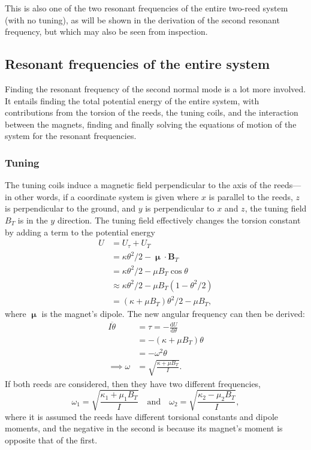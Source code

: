 \documentclass{article}
\begin{document}
This is also one of the two resonant frequencies of the entire two-reed system (with no tuning), as will be shown in the derivation of the second resonant frequency, but which may also be seen from inspection.

\subsection{Resonant frequencies of the entire system}
Finding the resonant frequency of the second normal mode is a lot more involved. It entails finding the total potential energy of the entire system, with contributions from the torsion of the reeds, the tuning coils, and the interaction between the magnets, finding and finally solving the equations of motion of the system for the resonant frequencies.
\subsubsection{Tuning}
The tuning coils induce a magnetic field perpendicular to the axis of the reeds---in other words, if a coordinate system is given where $x$ is parallel to the reeds, $z$ is perpendicular to the ground, and $y$ is perpendicular to $x$ and $z$, the tuning field $B_T$ is in the $y$ direction. The tuning field effectively changes the torsion constant by adding a term to the potential energy
\begin{equation*}
    \begin{aligned}
        U   &= U_\tau + U_T \\
            &= \kappa\theta^2/2 - \bm{\upmu}\cdot\mathbf{B}_T \\
            &= \kappa\theta^2/2 - \mu B_T \cos \theta \\
            &\approx \kappa\theta^2/2 - \mu B_T (1-\theta^2/2) \\
            &= (\kappa+\mu B_T)\theta^2/2 - \mu B_T,
    \end{aligned}
\end{equation*}
where $\bm{\upmu}$ is the magnet's dipole. The new angular frequency can then be derived:
\begin{equation*}
    \begin{aligned}
        I \ddot{\theta} &= \tau = -\frac{\mathrm{d}U}{\mathrm{d}\theta} \\
            &= -(\kappa + \mu B_T)\theta \\
            &= -\omega^2 \theta \\
           \implies \omega &=  \sqrt{\frac{\kappa + \mu B_T}{I}}.
    \end{aligned}
\end{equation*}
If both reeds are considered, then they have two different frequencies,
\begin{equation*}
    \omega_1 = \sqrt{\frac{\kappa_1 + \mu_1 B_T}{I}}\quad\text{and}\quad\omega_2 = \sqrt{\frac{\kappa_2 - \mu_2 B_T}{I}},
\end{equation*}
where it is assumed the reeds have different torsional constants and dipole moments, and the negative in the second is because its magnet's moment is opposite that of the first.
\end{document}
